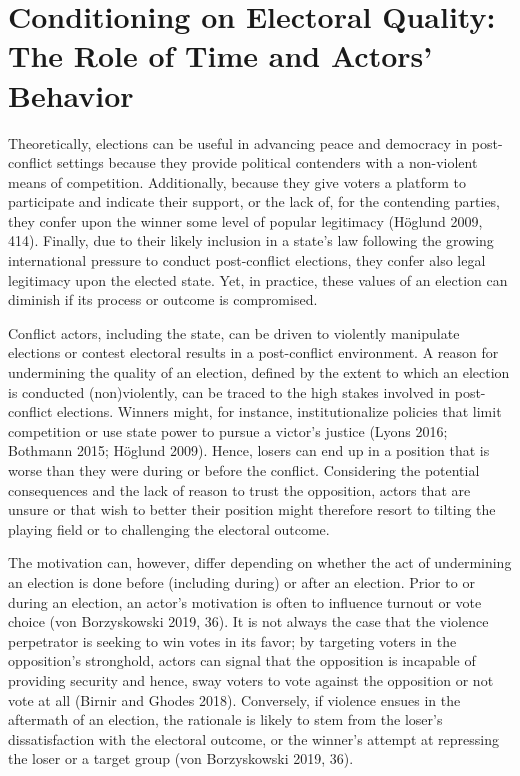 \documentclass [11pt]{article}
\begin{document}
\section*{Conditioning on Electoral Quality: The Role of Time and Actors' Behavior} %

Theoretically, elections can be useful in advancing peace and democracy in post-conflict settings because they provide political contenders with a non-violent means of competition. Additionally, because they give voters a platform to participate and indicate their support, or the lack of, for the contending parties, they confer upon the winner some level of popular legitimacy (Höglund 2009, 414). Finally, due to their likely inclusion in a state's law following the growing international pressure to conduct post-conflict elections, they confer also legal legitimacy upon the elected state. Yet, in practice, these values of an election can diminish if its process or outcome is compromised.

Conflict actors, including the state, can be driven to violently manipulate elections or contest electoral results in a post-conflict environment. A reason for undermining the quality of an election, defined by the extent to which an election is conducted (non)violently, can be traced to the high stakes involved in post-conflict elections. Winners might, for instance, institutionalize policies that limit competition or use state power to pursue a victor's justice (Lyons 2016; Bothmann 2015; Höglund 2009). Hence, losers can end up in a position that is worse than they were during or before the conflict. Considering the potential consequences and the lack of reason to trust the opposition, actors that are unsure or that wish to better their position might therefore resort to tilting the playing field or to challenging the electoral outcome.

The motivation can, however, differ depending on whether the act of undermining an election is done before (including during) or after an election. Prior to or during an election, an actor's motivation is often to influence turnout or vote choice (von Borzyskowski 2019, 36). It is not always the case that the violence perpetrator is seeking to win votes in its favor; by targeting voters in the opposition's stronghold, actors can signal that the opposition is incapable of providing security and hence, sway voters to vote against the opposition or not vote at all (Birnir and Ghodes 2018). Conversely, if violence ensues in the aftermath of an election, the rationale is likely to stem from the loser's dissatisfaction with the electoral outcome, or the winner's attempt at repressing the loser or a target group (von Borzyskowski 2019, 36).
\end{document}

